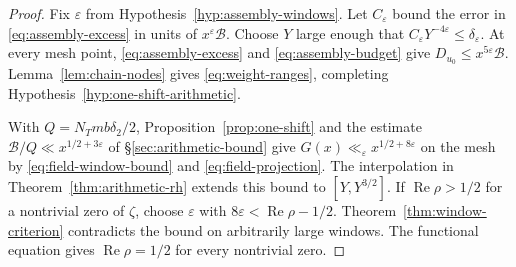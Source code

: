\begin{proof}
Fix $\varepsilon$ from Hypothesis~\ref{hyp:assembly-windows}. Let
$C_\varepsilon$ bound the error in \eqref{eq:assembly-excess} in
units of $x^\varepsilon\mathcal B$. Choose $Y$ large enough that
$C_\varepsilon Y^{-4\varepsilon}\le\delta_\varepsilon$.
At every mesh point, \eqref{eq:assembly-excess}
and \eqref{eq:assembly-budget} give $D_{u_0}\le x^{5\varepsilon}\mathcal B$.
Lemma~\ref{lem:chain-nodes} gives \eqref{eq:weight-ranges}, completing
Hypothesis~\ref{hyp:one-shift-arithmetic}.

With $Q=N_Tmb\delta_2/2$, Proposition~\ref{prop:one-shift} and
the estimate $\mathcal B/Q\ll x^{1/2+3\varepsilon}$ of
\S\ref{sec:arithmetic-bound} give $G(x)\ll_\varepsilon
x^{1/2+8\varepsilon}$ on the mesh by \eqref{eq:field-window-bound}
and \eqref{eq:field-projection}. The interpolation in
Theorem~\ref{thm:arithmetic-rh} extends this bound to $[Y,Y^{3/2}]$.
If $\operatorname{Re}\rho>1/2$ for a nontrivial zero of $\zeta$,
choose $\varepsilon$ with $8\varepsilon<\operatorname{Re}\rho-1/2$.
Theorem~\ref{thm:window-criterion} contradicts the bound on arbitrarily
large windows. The functional equation gives $\operatorname{Re}\rho=1/2$
for every nontrivial zero.
\end{proof}
